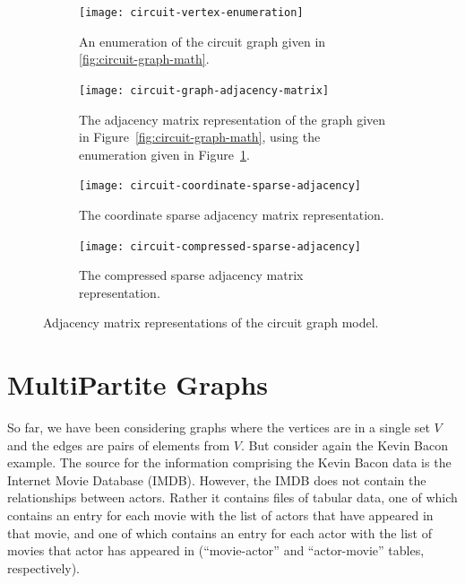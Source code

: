 \begin{figure}[bh]
  \begin{subfigure}[t]{0.175\textwidth}
    \centering
    \texttt{[image: circuit-vertex-enumeration]}
    \caption{\label{fig:circuit-vertex-enumeration}
    An enumeration of the circuit graph given in \protect\ref{fig:circuit-graph-math}.}
  \end{subfigure}
  \hspace{1em}
  \begin{subfigure}[t]{0.25\textwidth}
    \centering
    \texttt{[image: circuit-graph-adjacency-matrix]}
    \caption{\label{fig:circuit-graph-adjacency-matrix}
    The adjacency matrix representation of the graph given in Figure~\protect\ref{fig:circuit-graph-math},
    using the enumeration given in Figure~\protect\ref{fig:circuit-vertex-enumeration}.}
  \end{subfigure}
  \hspace{1em}
  \begin{subfigure}[t]{0.175\textwidth}
    \small
    \centering
    \texttt{[image: circuit-coordinate-sparse-adjacency]}
    \caption{\label{fig:circuit-coordinate-sparse-adjacency}
    The coordinate sparse adjacency matrix representation.}
  \end{subfigure}
  \hspace{1em}
  \begin{subfigure}[t]{0.3\textwidth}
    \small
    \centering
    \texttt{[image: circuit-compressed-sparse-adjacency]}
    \caption{\label{fig:circuit-compressed-sparse-adjacency}
    The compressed sparse adjacency matrix representation.}
  \end{subfigure}
  \caption{Adjacency matrix representations of the circuit graph model.}
\end{figure}





\section{MultiPartite Graphs}
\label{sec:multipartite}


So far, we have been considering graphs where the vertices are in a single set $V$
and the edges are pairs of elements from $V$.  
%
%
But consider again the Kevin Bacon example.  The source for the information comprising the
Kevin Bacon data is the Internet Movie Database (IMDB).  However, the IMDB does not contain
the relationships between actors.  Rather it contains files of tabular data, one of which
contains an entry for each movie with the list of actors that have appeared in that movie,
and one of which contains an entry for each actor with the list of movies that actor has
appeared in (``movie-actor'' and ``actor-movie'' tables, respectively).

